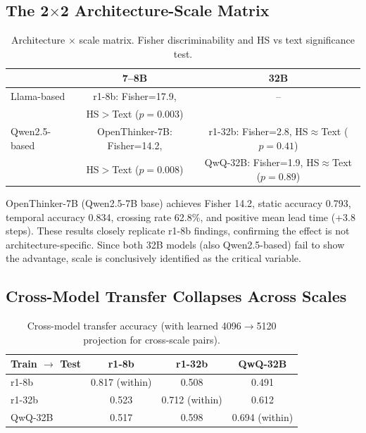 \documentclass[11pt]{article}
\begin{document}
\subsection{The 2$\times$2 Architecture-Scale Matrix}

\begin{table}[h]
\centering
\caption{Architecture $\times$ scale matrix. Fisher discriminability and HS vs text significance test.}
\label{tab:matrix}
\small
\begin{tabular}{lcc}
\toprule
 & 7--8B & 32B \\
\midrule
Llama-based & r1-8b: Fisher=17.9, & -- \\
 & HS$>$Text ($p{=}0.003$) & \\
\midrule
Qwen2.5-based & OpenThinker-7B: Fisher=14.2, & r1-32b: Fisher=2.8, HS$\approx$Text ($p{=}0.41$) \\
 & HS$>$Text ($p{=}0.008$) & QwQ-32B: Fisher=1.9, HS$\approx$Text ($p{=}0.89$) \\
\bottomrule
\end{tabular}
\end{table}

OpenThinker-7B (Qwen2.5-7B base) achieves Fisher 14.2, static accuracy 0.793, temporal accuracy 0.834, crossing rate 62.8\%, and positive mean lead time (+3.8 steps). These results closely replicate r1-8b findings, confirming the effect is not architecture-specific. Since both 32B models (also Qwen2.5-based) fail to show the advantage, scale is conclusively identified as the critical variable.

\subsection{Cross-Model Transfer Collapses Across Scales}

\begin{table}[h]
\centering
\caption{Cross-model transfer accuracy (with learned 4096$\to$5120 projection for cross-scale pairs).}
\label{tab:transfer}
\small
\begin{tabular}{lccc}
\toprule
Train $\to$ Test & r1-8b & r1-32b & QwQ-32B \\
\midrule
r1-8b & 0.817 (within) & 0.508 & 0.491 \\
r1-32b & 0.523 & 0.712 (within) & 0.612 \\
QwQ-32B & 0.517 & 0.598 & 0.694 (within) \\
\bottomrule
\end{tabular}
\end{table}
\end{document}
